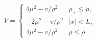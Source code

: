 \begin{equation} V=\left\{\begin{array}{ll} 4\mu^2-v/\rho^2 &\mbox{$\rho_{+}\leq\rho,$}\\
-2\mu^2-v/\rho^2 &\mbox{$|x|<L,$}\\ 4\mu^2-v/\rho^2
&\mbox{$\rho\leq \rho_{-}.$}\end{array}\right.\end{equation}

